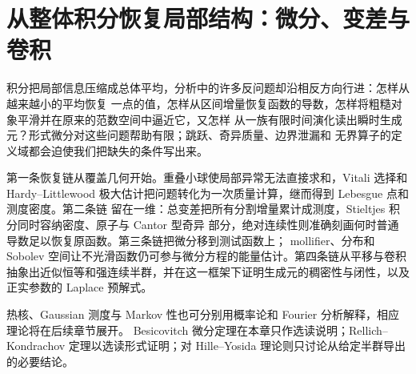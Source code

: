 \chapter{从整体积分恢复局部结构：微分、变差与卷积}\label{ch:04}

积分把局部信息压缩成总体平均，分析中的许多反问题却沿相反方向行进：怎样从越来越小的平均恢复
一点的值，怎样从区间增量恢复函数的导数，怎样将粗糙对象平滑并在原来的范数空间中逼近它，又怎样
从一族有限时间演化读出瞬时生成元？形式微分对这些问题帮助有限；跳跃、奇异质量、边界泄漏和
无界算子的定义域都会迫使我们把缺失的条件写出来。

第一条恢复链从覆盖几何开始。重叠小球使局部异常无法直接求和，Vitali 选择和
Hardy--Littlewood 极大估计把问题转化为一次质量计算，继而得到 Lebesgue 点和测度密度。第二条链
留在一维：总变差把所有分割增量累计成测度，Stieltjes 积分同时容纳密度、原子与 Cantor 型奇异
部分，绝对连续性则准确刻画何时普通导数足以恢复原函数。第三条链把微分移到测试函数上；
mollifier、分布和 Sobolev 空间让不光滑函数仍可参与微分方程的能量估计。第四条链从平移与卷积
抽象出近似恒等和强连续半群，并在这一框架下证明生成元的稠密性与闭性，以及正实参数的 Laplace
预解式。

热核、Gaussian 测度与 Markov 性也可分别用概率论和 Fourier 分析解释，相应理论将在后续章节展开。
Besicovitch 微分定理在本章只作选读说明；Rellich--Kondrachov 定理以选读形式证明；对
Hille--Yosida 理论则只讨论从给定半群导出的必要结论。





